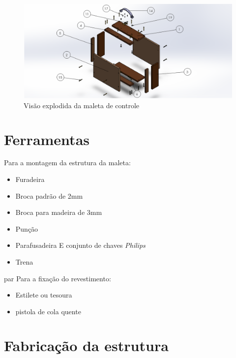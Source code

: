 \begin{figure} [H]
    \centering
    \includegraphics[width=\textwidth]{Figuras/montagemMaletasEstrutura/controleExplodido.png}
    \caption{Visão explodida da maleta de controle}
    \label{fig:controleExplodido}
\end{figure}


\section{Ferramentas}

\par Para a montagem da estrutura da maleta:
\begin{itemize}
    \item Furadeira
    \item Broca padrão de 2mm
    \item Broca para madeira de 3mm
    \item Punção
    \item Parafusadeira E conjunto de chaves \textit{Philips}
    \item Trena
\end{itemize}
par Para a fixação do revestimento:
\begin{itemize}
    \item Estilete ou tesoura
    \item pistola de cola quente
\end{itemize}


\section{Fabricação da estrutura}

